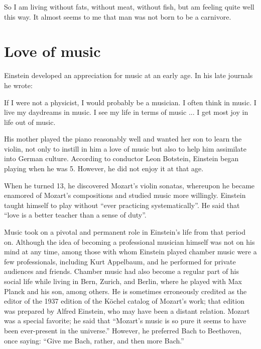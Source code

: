 \documentclass[twoside]{memoir}
\begin{document}
\begin{displayquote}

So I am living without fats, without meat, without fish, but am feeling quite well this way. It almost seems to me that man was not born to be a carnivore.

\end{displayquote}
\section{Love of music}\label{love-of-music}

Einstein developed an appreciation for music at an early age. In his late journals he wrote:

\begin{displayquote}

If I were not a physicist, I would probably be a musician. I often think in music. I live my daydreams in music. I see my life in terms of music ... I get most joy in life out of music.

\end{displayquote}
His mother played the piano  reasonably well and wanted her son to learn the violin,  not only to instill in him a love of music but also to help him assimilate into German culture. According to conductor Leon Botstein,  Einstein began playing when he was 5. However, he did not enjoy it at that age.

When he turned 13, he discovered Mozart's  violin sonatas, whereupon he became enamored of Mozart's compositions and studied music more willingly. Einstein taught himself to play without \enquote{ever practicing systematically}. He said that \enquote{love is a better teacher than a sense of duty}.

Music took on a pivotal and permanent role in Einstein's life from that period on. Although the idea of becoming a professional musician himself was not on his mind at any time, among those with whom Einstein played chamber music  were a few professionals, including Kurt Appelbaum, and he performed for private audiences and friends. Chamber music had also become a regular part of his social life while living in Bern, Zurich, and Berlin, where he played with Max Planck and his son, among others. He is sometimes erroneously credited as the editor of the 1937 edition of the Köchel catalog of Mozart's work; that edition was prepared by Alfred Einstein,  who may have been a distant relation.\cite{kGuWC}\cite{OIn6p} Mozart was a special favorite; he said that \enquote{Mozart's music is so pure it seems to have been ever-present in the universe.} However, he preferred Bach to Beethoven, once saying: \enquote{Give me Bach, rather, and then more Bach.} 
\end{document}
